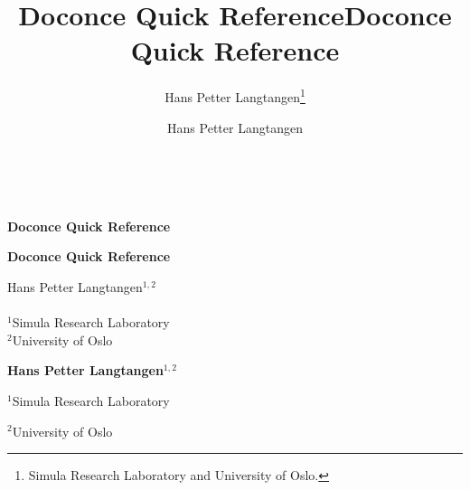 \documentclass[twoside]{book}
\begin{document}





\title{Doconce Quick Reference}


\thispagestyle{empty}
\hbox{\ \ }
\vfill
\begin{center}
{\huge{\bfseries{Doconce Quick Reference}}}


\title*{Doconce Quick Reference}


\begin{center}
{\LARGE\bf Doconce Quick Reference}
\end{center}




\author{Hans Petter Langtangen\footnote{Simula Research Laboratory and University of Oslo.}}

\vspace{1.3cm}

    {\Large\textsf{Hans Petter Langtangen${}^{1, 2}$}}\\ [3mm]
    
\ \\ [2mm]

{\large\textsf{${}^1$Simula Research Laboratory} \\ [1.5mm]}
{\large\textsf{${}^2$University of Oslo} \\ [1.5mm]}

\author{Hans Petter Langtangen}


\begin{center}
{\bf Hans Petter Langtangen${}^{1, 2}$} \\ [0mm]
\end{center}

\begin{center}
\centerline{{\small ${}^1$Simula Research Laboratory}}
\centerline{{\small ${}^2$University of Oslo}}
\end{center}




\end{center}
\end{document}
